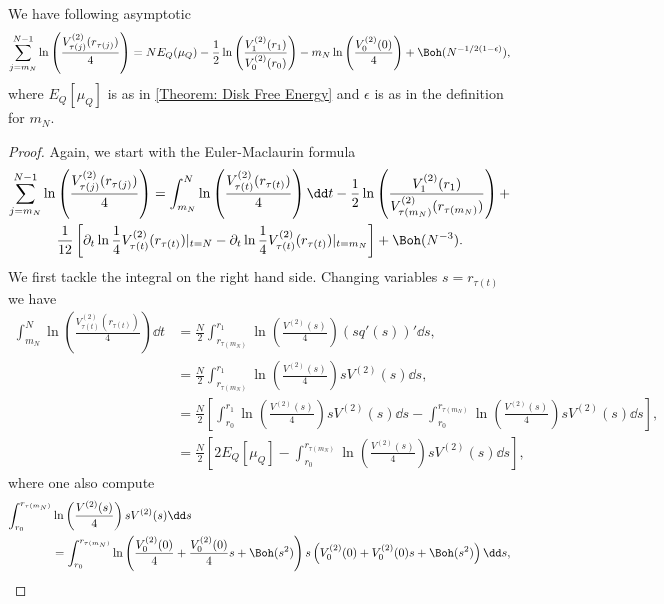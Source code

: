 \begin{proposicao}	\label{Proposition: mn-N lnv disk}
	We have following asymptotic
	\begin{equation}
		\sum_{j=m_N}^{N-1}\ln \left( \frac{V^{(2)}_{\tau(j)}(r_{\tau(j)})}{4}\right) = N E_Q(\mu_Q)  - \frac{1}{2} \ln \left( \frac{V^{(2)}_{1}(r_1)}{V^{(2)}_{0}(r_{0})} \right)  - m_N \ln\left(  \frac{V^{(2)}_0(0)}{4} \right) + \Boh(N^{-1/2(1-\epsilon)}),
	\end{equation}
	where $E_Q[\mu_Q]$ is as in \autoref{Theorem: Disk Free Energy} and $\epsilon$ is as in the definition for $m_N$.
\end{proposicao}
\begin{proof}
	Again, we start with the Euler-Maclaurin formula
		\begin{multline}
		\sum_{j=m_N}^{N-1} \ln \left( \frac{V^{(2)}_{\tau(j)}(r_{\tau(j)})}{4}\right) = \int_{m_N}^{N} \ln \left( \frac{V^{(2)}_{\tau(t)}(r_{\tau(t)})}{4}\right)  \dd t - \frac{1}{2} \ln \left( \frac{V^{(2)}_{1}(r_1)}{V^{(2)}_{\tau(m_N)}(r_{\tau(m_N)})} \right) + \\ \frac{1}{12} \left[ \partial_t \ln \frac{1}{4} V^{(2)}_{\tau(t)}(r_{\tau(t)}) |_{t=N} - \partial_t \ln \frac{1}{4} V^{(2)}_{\tau(t)}(r_{\tau(t)}) |_{t=m_N}\right]  + \Boh(N^{-3}).
	\end{multline}
	We first tackle the integral on the right hand side. Changing variables $s = r_{\tau(t)}$ we have
	\begin{align}
		\int_{m_N}^{N} \ln \left( \frac{V^{(2)}_{\tau(t)}(r_{\tau(t)})}{4}\right)  \dd t & = \frac{N}{2} \int_{r_{\tau(m_N)}}^{r_1} \ln\left(\frac{V^{(2)}(s)}{4}\right) (sq'(s))' \dd s, \\
		& =  \frac{N}{2} \int_{r_{\tau(m_N)}}^{r_1} \ln\left(\frac{V^{(2)}(s)}{4}\right)  s V^{(2)}(s) \dd s, \\
		& = \frac{N}{2} \left[ \int_{r_0}^{r_1}\ln\left(\frac{V^{(2)}(s)}{4}\right) s V^{(2)}(s) \dd s -  \int_{r_0}^{r_{\tau(m_N)}} \ln\left(\frac{V^{(2)}(s)}{4}\right) s V^{(2)}(s) \dd s  \right], \\
		& = \frac{N}{2} \left[ 2 E_Q[\mu_Q] -  \int_{r_0}^{r_{\tau(m_N)}} \ln\left(\frac{V^{(2)}(s)}{4}\right) s V^{(2)}(s) \dd s  \right], 
	\end{align}
	where one also compute
	\begin{align}
		\int_{r_0}^{r_{\tau(m_N)}} & \ln\left(\frac{V^{(2)}(s)}{4}\right) s V^{(2)}(s) \dd s \\ 
		& = \int_{r_0}^{r_{\tau(m_N)}} \ln\left(\frac{V^{(2)}_0(0)}{4} + \frac{V^{(2)}_0(0)}{4} s + \Boh(s^2) \right) s \left( V^{(2)}_0(0) + V^{(2)}_0(0) s + \Boh(s^2) \right) \dd s, \\

\end{align}
\end{proof}
